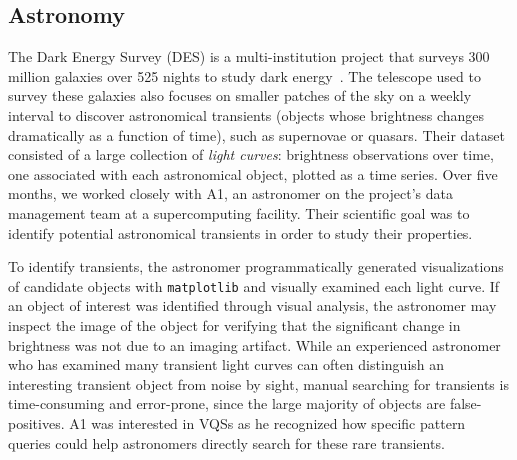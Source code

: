  \subsection{Astronomy}
 \par\noindent{} 
 \npar The Dark Energy Survey (DES) is a multi-institution project that surveys 300 million galaxies over 525 nights to study dark energy~\cite{DrlicaWagner2018}. The telescope used to survey these galaxies also focuses on smaller patches of the sky on a weekly interval to discover astronomical transients (objects whose brightness changes dramatically as a function of time), such as supernovae or quasars. Their dataset consisted of a large collection of \emph{light curves}: brightness observations over time, one associated with each astronomical object, plotted as a time series. Over five months, we worked closely with A1, an astronomer on the project's data management team at a supercomputing facility. Their scientific goal was to identify potential astronomical transients in order to study their properties. 
 \par\noindent{} 
 \npar To identify transients, the astronomer programmatically generated visualizations of candidate objects with \texttt{matplotlib} and visually examined each light curve. If an object of interest was identified through visual analysis, the astronomer may inspect the image of the object for verifying that the significant change in brightness was not due to an imaging artifact. While an experienced astronomer who has examined many transient light curves can often distinguish an interesting transient object from noise by sight, manual searching for transients is time-consuming and error-prone, since the large majority of objects are false-positives. A1 was interested in VQSs as he recognized how specific pattern queries could help astronomers directly search for these rare transients.
